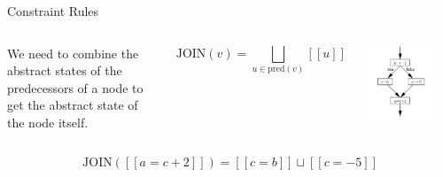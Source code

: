 \documentclass[aspectratio=169,xcolor=dvipsnames]{beamer}
\begin{document}
\begin{frame}[fragile]{Constraint Rules}
	\begin{columns}[c] %


		We need to combine the abstract states of the predecessors of a node to get the
		abstract state of the node itself.

		\[
			\text{JOIN}(v) = \bigsqcup_{u \in \text{pred}(v)} [[u]]
		\]

		\includegraphics[width=0.8\textwidth]{img/2.png}
	\end{columns}

	$$\text{JOIN}([[a=c+2]]) = [[c=b]] \sqcup [[c=-5]]$$
\end{frame}

\end{document}

